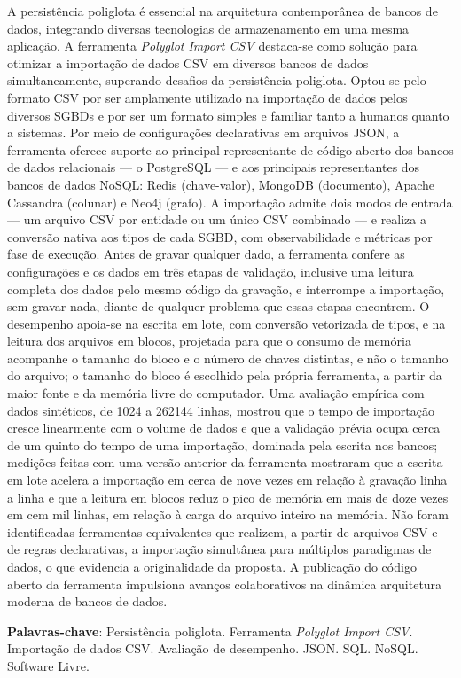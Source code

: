 \documentclass[
  12pt,
  oneside,
  a4paper,
  chapter=TITLE,
  section=TITLE,
  english,
  brazil,
]{abntex2}
\begin{document}
\begin{resumo}
  A persistência poliglota é essencial na arquitetura contemporânea de bancos de dados,
  integrando diversas tecnologias de armazenamento em uma mesma aplicação. A ferramenta
  \textit{Polyglot Import CSV} destaca-se como solução para otimizar a importação de dados
  CSV em diversos bancos de dados simultaneamente, superando desafios da persistência
  poliglota. Optou-se pelo formato CSV por ser amplamente utilizado na importação de dados
  pelos diversos SGBDs e por ser um formato simples e familiar tanto a humanos quanto a
  sistemas. Por meio de configurações declarativas em arquivos JSON, a ferramenta oferece
  suporte ao principal representante de código aberto dos bancos de dados relacionais ---
  o PostgreSQL --- e aos principais representantes dos bancos de dados NoSQL: Redis
  (chave-valor), MongoDB (documento), Apache Cassandra (colunar) e Neo4j (grafo). A
  importação admite dois modos de entrada --- um arquivo CSV por entidade ou um único CSV
  combinado --- e realiza a conversão nativa aos tipos de cada SGBD, com observabilidade e
  métricas por fase de execução. Antes de gravar qualquer dado, a ferramenta confere as
  configurações e os dados em três etapas de validação, inclusive uma leitura completa dos
  dados pelo mesmo código da gravação, e interrompe a importação, sem gravar nada, diante de
  qualquer problema que essas etapas encontrem. O desempenho apoia-se na escrita em lote,
  com conversão vetorizada de tipos, e na leitura dos arquivos em blocos, projetada para que
  o consumo de memória acompanhe o tamanho do bloco e o número de chaves distintas, e não o
  tamanho do arquivo; o tamanho do bloco é escolhido pela própria ferramenta, a partir da
  maior fonte e da memória livre do computador. Uma avaliação empírica com dados sintéticos, de \num{1024} a \num{262144} linhas,
  mostrou que o tempo de importação cresce linearmente com o volume de dados e que a
  validação prévia ocupa cerca de um quinto do tempo de uma importação, dominada pela escrita
  nos bancos; medições feitas com uma versão anterior da ferramenta mostraram que a escrita
  em lote acelera a importação em cerca de nove vezes em relação à gravação linha a linha e
  que a leitura em blocos reduz o pico de memória em mais de doze vezes em cem mil linhas,
  em relação à carga do arquivo inteiro na memória. Não foram identificadas ferramentas
  equivalentes que realizem, a partir de arquivos CSV e de regras declarativas, a importação
  simultânea para múltiplos paradigmas de dados, o que evidencia a originalidade da proposta.
  A publicação do código aberto da ferramenta impulsiona avanços colaborativos na dinâmica
  arquitetura moderna de bancos de dados.

  \vspace{\onelineskip}

  \noindent
  \textbf{Palavras-chave}: Persistência poliglota. Ferramenta \textit{Polyglot Import CSV}.
  Importação de dados CSV. Avaliação de desempenho. JSON. SQL. NoSQL. Software Livre.
\end{resumo}
\end{document}
